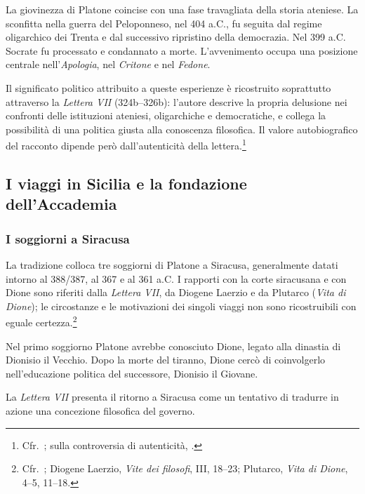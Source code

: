 La giovinezza di Platone coincise con una fase travagliata della storia ateniese. La sconfitta nella guerra del Peloponneso, nel 404 a.C., fu seguita dal regime oligarchico dei Trenta e dal successivo ripristino della democrazia. Nel 399 a.C. Socrate fu processato e condannato a morte. L'avvenimento occupa una posizione centrale nell'\emph{Apologia}, nel \emph{Critone} e nel \emph{Fedone}.

Il significato politico attribuito a queste esperienze è ricostruito soprattutto attraverso la \emph{Lettera VII} (324b--326b): l'autore descrive la propria delusione nei confronti delle istituzioni ateniesi, oligarchiche e democratiche, e collega la possibilità di una politica giusta alla conoscenza filosofica. Il valore autobiografico del racconto dipende però dall'autenticità della lettera.\footnote{Cfr.\ \cite[94--95]{palumbo2015}; sulla controversia di autenticità, \cite{burnyeatfrede2015}.}

\subsection{I viaggi in Sicilia e la fondazione dell'Accademia}

\subsubsection{I soggiorni a Siracusa}

La tradizione colloca tre soggiorni di Platone a Siracusa, generalmente datati intorno al 388/387, al 367 e al 361 a.C. I rapporti con la corte siracusana e con Dione sono riferiti dalla \emph{Lettera VII}, da Diogene Laerzio e da Plutarco (\emph{Vita di Dione}); le circostanze e le motivazioni dei singoli viaggi non sono ricostruibili con eguale certezza.\footnote{Cfr.\ \cite[94--95]{palumbo2015}; Diogene Laerzio, \emph{Vite dei filosofi}, III, 18--23; Plutarco, \emph{Vita di Dione}, 4--5, 11--18.}

Nel primo soggiorno Platone avrebbe conosciuto Dione, legato alla dinastia di Dionisio il Vecchio. Dopo la morte del tiranno, Dione cercò di coinvolgerlo nell'educazione politica del successore, Dionisio il Giovane.

La \emph{Lettera VII} presenta il ritorno a Siracusa come un tentativo di tradurre in azione una concezione filosofica del governo.

